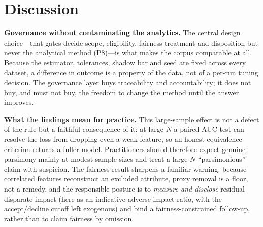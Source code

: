 \documentclass[9pt,journal]{IEEEtai}
\begin{document}
\section{Discussion}\label{sec:discussion}
\textbf{Governance without contaminating the analytics.} The central design choice---that gates
decide scope, eligibility, fairness treatment and disposition but never the analytical method
(P8)---is what makes the corpus comparable at all. Because the estimator, tolerances, shadow bar
and seed are fixed across every dataset, a difference in outcome is a property of the data, not
of a per-run tuning decision. The governance layer buys traceability and accountability; it does
not buy, and must not buy, the freedom to change the method until the answer improves.

\textbf{What the findings mean for practice.} This large-sample effect is not a defect of the
rule but a faithful consequence of it: at large $N$ a paired-AUC test can resolve the loss from
dropping even a weak feature, so an honest equivalence criterion returns a fuller model.
Practitioners should therefore expect genuine parsimony mainly at modest sample sizes and treat a
large-$N$ ``parsimonious'' claim with suspicion. The fairness result sharpens a familiar warning:
because correlated features reconstruct an excluded attribute, proxy removal is a floor, not a
remedy, and the responsible posture is to \emph{measure and disclose} residual disparate impact
(here as an indicative adverse-impact ratio, with the accept/decline cutoff left exogenous) and
bind a fairness-constrained follow-up, rather than to claim fairness by omission.
\end{document}
